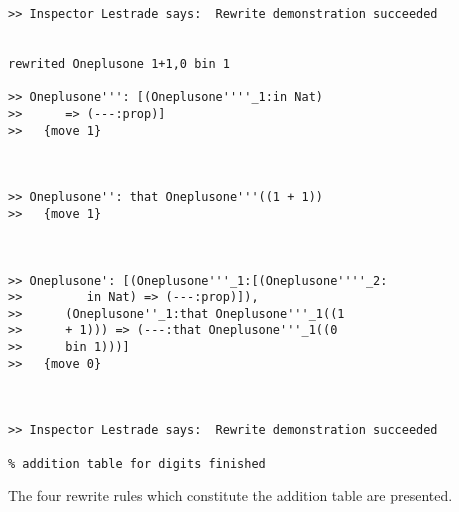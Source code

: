 \documentclass{article}
\begin{document}
\begin{verbatim}
>> Inspector Lestrade says:  Rewrite demonstration succeeded


rewrited Oneplusone 1+1,0 bin 1

>> Oneplusone''': [(Oneplusone''''_1:in Nat)
>>      => (---:prop)]
>>   {move 1}



>> Oneplusone'': that Oneplusone'''((1 + 1))
>>   {move 1}



>> Oneplusone': [(Oneplusone'''_1:[(Oneplusone''''_2:
>>         in Nat) => (---:prop)]),
>>      (Oneplusone''_1:that Oneplusone'''_1((1
>>      + 1))) => (---:that Oneplusone'''_1((0
>>      bin 1)))]
>>   {move 0}



>> Inspector Lestrade says:  Rewrite demonstration succeeded

% addition table for digits finished

\end{verbatim}

The four rewrite rules which constitute the addition table are presented.
\end{document}
